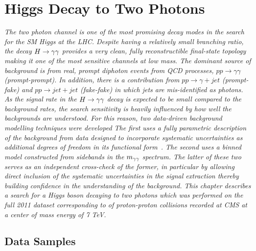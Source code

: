\chapter{Higgs Decay to Two Photons}
\label{chap:hgg}

\emph{The two photon channel is one of the most promising decay modes in the search for the SM Higgs
at the LHC. Despite having a relatively small branching ratio, the decay $H\rightarrow\gamma\gamma$ 
provides a very clean, fully reconstructible final-state topology making it 
one of the most sensitive channels at low mass.
The dominant source of background is from real, prompt diphoton events from QCD 
processes, $pp\rightarrow\gamma\gamma$ (prompt-prompt).
In addition, there is a contribution from $pp\rightarrow\gamma+jet$ (prompt-fake) and 
$pp\rightarrow jet+jet$ (fake-fake) in which jets are mis-identified as photons. 
As the signal rate in the $H\rightarrow\gamma\gamma$ decay is expected to be small compared to the background rates,
the search sensitivity is heavily influenced by how well the backgrounds are understood.
For this reason, two data-driven background modelling techniques were developed
The first uses a fully parametric
description of the background from data designed to incorporate systematic uncertainties as additional degrees of 
freedom in its functional form~\citep{HIG-11-033}. The second uses a binned model constructed from 
sidebands in the $m_{\gamma\gamma}$ spectrum. The latter of these two serves as an independent cross-check of the former,
in particular by allowing direct inclusion of the systematic uncertainties in the signal extraction thereby
building confidence in the understanding of the background. 
This chapter describes a search for a Higgs boson decaying to two photons
which was performed on the full 2011 dataset corresponding to \clumi of proton-proton collisions 
recorded at CMS at a center of mass energy of 7 TeV.}

\section{Data Samples}
\label{sec:datasamples}


